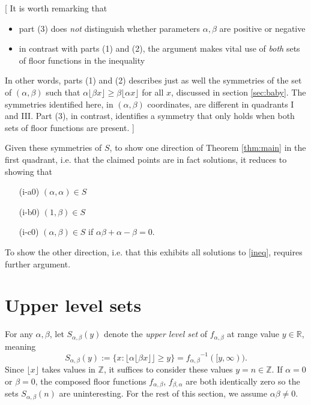 \documentclass[12pt,letterpaper, reqno]{amsart}
\theoremstyle{definition}
\theoremstyle{remark}
\newcommand{\RR}{\ensuremath{\mathbb{R}}}
\newcommand{\ZZ}{\ensuremath{\mathbb{Z}}}
\newcommand{\floor}[1]{\lfloor{#1}\rfloor}
\begin{document}
[ It is worth remarking that
\begin{itemize}
\item part (3) does {\em not} distinguish whether parameters $\alpha,\beta$ are positive or negative 
\item in contrast with parts (1) and (2), the argument makes vital use of {\em both} sets of floor functions in the inequality
\end{itemize}
In other words, parts (1) and (2) describes just as well the symmetries of the set of $(\alpha,\beta)$ 
such that $ \alpha\floor{\beta x} \geq \beta\floor{\alpha x}$ for all $x$, discussed in section \ref{sec:baby}.
The symmetries identified here, in $(\alpha,\beta)$ coordinates, are {different} in quadrants I and III.
Part (3), in contrast, identifies a symmetry that only holds when both sets of floor functions are present. ]

Given these symmetries of $S$, to show one direction of Theorem \ref{thm:main} in the first quadrant, i.e. that the claimed points are in fact solutions, it reduces to showing that
\begin{enumerate}
\item[(i-a0)] $(\alpha,\alpha) \in S$ 
\item[(i-b0)] $(1,\beta)\in S$
\item[(i-c0)] $(\alpha,\beta)\in S$ if $\alpha\beta + \alpha- \beta = 0$.
\end{enumerate}
To show the other direction, i.e. that this exhibits all solutions to \eqref{ineq}, requires further argument.

%
%
\section{Upper level sets}\label{sec:upper-level}
For any $\alpha,\beta$, let $S_{\alpha,\beta}(y)$ denote the {\em upper level set} of $f_{\alpha,\beta}$ at 
range value $y \in \RR$, meaning
\[ 
S_{\alpha,\beta}(y) := \{x : \floor{\alpha\floor{\beta x}}\geq y\} = {f_{\alpha,\beta}}^{-1}([y,\infty)) . 
\]
Since $\floor{x}$ takes values in $\ZZ$, it suffices to consider these values $y= n\in\ZZ$.
If  $\alpha=0$ or $\beta=0$, the composed floor functions $f_{\alpha,\beta}$, $f_{\beta,\alpha}$ are both identically zero so the sets $S_{\alpha,\beta}(n)$ are uninteresting. For the rest of this section, we assume $\alpha\beta\neq 0$.
\end{document}
